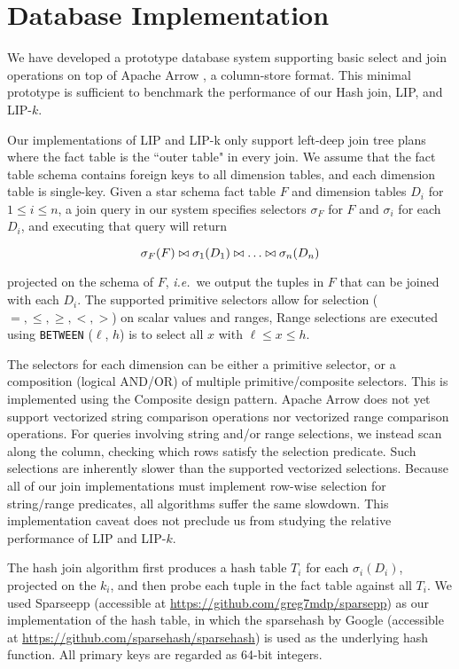 

\section{Database Implementation}

We have developed a prototype database system supporting basic select and join operations on top of Apache Arrow \cite{apachearrow}, a column-store format. This minimal prototype is sufficient to benchmark the performance of our Hash join, LIP, and LIP-$k$.

Our implementations of LIP and LIP-k only support left-deep join tree plans where the fact table is the ``outer table" in every join. We assume that the fact table schema contains foreign keys to all dimension tables, and each dimension table is single-key. Given a star schema fact table $F$ and dimension tables $D_i$ for $1 \leq i \leq n$, a join query in our system specifies selectors $\sigma_F$ for $F$ and $\sigma_i$ for each $D_i$, and executing that query will return 

$$\sigma_F(F) \bowtie \sigma_1(D_1) \bowtie \dots \bowtie \sigma_n(D_n)$$

\noindent projected on the schema of $F$, {\it i.e.}~we output the tuples in $F$ that can be joined with each $D_i$. The supported primitive selectors allow for selection ($=, \leq, \geq, <, >$) on scalar values and ranges, Range selections are executed using \texttt{BETWEEN} ($\ell$, $h$) is to select all $x$ with $\ell \leq x \leq h$. 

The selectors for each dimension can be either a primitive selector, 
or a composition (logical AND/OR) of multiple primitive/composite selectors. 
This is implemented using the Composite design pattern.
Apache Arrow does not yet support vectorized string comparison operations nor vectorized range comparison operations.
For queries involving string and/or range selections, 
we instead scan along the column, checking which rows satisfy the selection predicate. 
Such selections are inherently slower than the supported vectorized selections. 
Because all of our join implementations must implement row-wise selection for string/range predicates, 
all algorithms suffer the same slowdown. 
This implementation caveat does not preclude us from studying the relative performance of LIP and LIP-$k$.

The hash join algorithm first produces a hash table $T_i$ for each $\sigma_i(D_i)$, projected on the $k_i$, and then probe each tuple in the fact table against all $T_i$. We used Sparseepp (accessible at \url{https://github.com/greg7mdp/sparsepp}) as our implementation of the hash table, in which the sparsehash by Google (accessible at \url{https://github.com/sparsehash/sparsehash}) is used as the underlying hash function. All primary keys are regarded as 64-bit integers.

